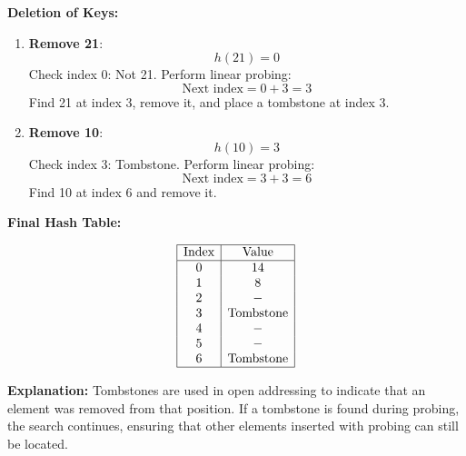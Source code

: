 \begin{example}
    \textbf{Deletion of Keys:}
    \begin{enumerate}
        \item \textbf{Remove 21}:
           \[
           h(21) = 0
           \]
           Check index 0: Not 21.  
           Perform linear probing:
           \[
           \text{Next index} = 0 + 3 = 3
           \]
           Find 21 at index 3, remove it, and place a tombstone at index 3.
    
        \item \textbf{Remove 10}:
           \[
           h(10) = 3
           \]
           Check index 3: Tombstone.  
           Perform linear probing:
           \[
           \text{Next index} = 3 + 3 = 6
           \]
           Find 10 at index 6 and remove it.
    \end{enumerate}
    
    \textbf{Final Hash Table:}
    
    \[
    \begin{array}{|c|c|}
    \hline
    \text{Index} & \text{Value} \\
    \hline
    0 & 14 \\
    1 & 8 \\
    2 & - \\
    3 & \text{Tombstone} \\
    4 & - \\
    5 & - \\
    6 & \text{Tombstone} \\
    \hline
    \end{array}
    \]
    
    \textbf{Explanation:} Tombstones are used in open addressing to indicate that an element was removed from that position. If a tombstone is found during probing, the search continues, ensuring that other elements inserted with probing can still be located.
    
\end{example}

